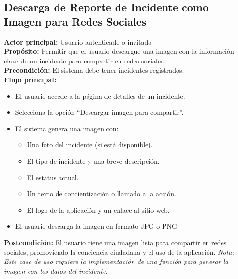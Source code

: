 \subsection{Descarga de Reporte de Incidente como Imagen para Redes Sociales}
\textbf{Actor principal:} Usuario autenticado o invitado\\
\textbf{Propósito:} Permitir que el usuario descargue una imagen con la información clave de un incidente para compartir en redes sociales.\\
\textbf{Precondición:} El sistema debe tener incidentes registrados.\\
\textbf{Flujo principal:}
\begin{itemize}
    \item El usuario accede a la página de detalles de un incidente.
    \item Selecciona la opción ``Descargar imagen para compartir''.
    \item El sistema genera una imagen con:
    \begin{itemize}
        \item Una foto del incidente (si está disponible).
        \item El tipo de incidente y una breve descripción.
        \item El estatus actual.
        \item Un texto de concientización o llamado a la acción.
        \item El logo de la aplicación y un enlace al sitio web.
    \end{itemize}
    \item El usuario descarga la imagen en formato JPG o PNG.
\end{itemize}
\textbf{Postcondición:} El usuario tiene una imagen lista para compartir en redes sociales, promoviendo la conciencia ciudadana y el uso de la aplicación.
\textit{Nota: Este caso de uso requiere la implementación de una función para generar la imagen con los datos del incidente.}
